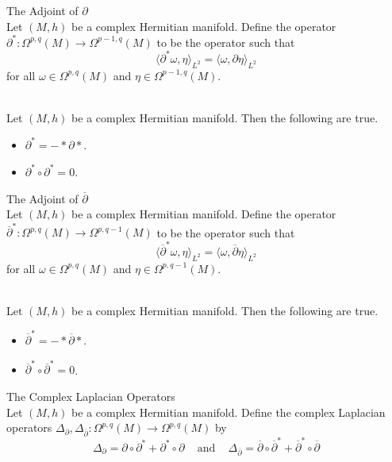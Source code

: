 \documentclass[a4paper]{article}
\begin{document}
\begin{defn}{The Adjoint of $\partial$}{}\\
Let $(M,h)$ be a complex Hermitian manifold. Define the operator $\partial^\ast:\Omega^{p,q}(M)\to\Omega^{p-1,q}(M)$ to be the operator such that $$\langle\partial^\ast\omega,\eta\rangle_{L^2}=\langle\omega,\partial\eta\rangle_{L^2}$$ for all $\omega\in\Omega^{p,q}(M)$ and $\eta\in\Omega^{p-1,q}(M)$. 
\end{defn}

\begin{prp}{}{}\\
Let $(M,h)$ be a complex Hermitian manifold. Then the following are true. 
\begin{itemize}
\item $\partial^\ast=-\ast\partial\ast$. 
\item $\partial^\ast\circ\partial^\ast=0$. 
\end{itemize}
\end{prp}

\begin{defn}{The Adjoint of $\overline{\partial}$}{}\\
Let $(M,h)$ be a complex Hermitian manifold. Define the operator $\overline{\partial}^\ast:\Omega^{p,q}(M)\to\Omega^{p,q-1}(M)$ to be the operator such that $$\langle\overline{\partial}^\ast\omega,\eta\rangle_{L^2}=\langle\omega,\overline{\partial}\eta\rangle_{L^2}$$ for all $\omega\in\Omega^{p,q}(M)$ and $\eta\in\Omega^{p,q-1}(M)$. 
\end{defn}

\begin{prp}{}{}\\
Let $(M,h)$ be a complex Hermitian manifold. Then the following are true. 
\begin{itemize}
\item $\overline{\partial}^\ast=-\ast\overline{\partial}\ast$. 
\item $\overline{\partial}^\ast\circ\overline{\partial}^\ast=0$. 
\end{itemize}
\end{prp}

\begin{defn}{The Complex Laplacian Operators}{}\\
Let $(M,h)$ be a complex Hermitian manifold. Define the complex Laplacian operators $\Delta_{\partial},\Delta_{\overline{\partial}}:\Omega^{p,q}(M)\to\Omega^{p,q}(M)$ by $$\Delta_\partial=\partial\circ\partial^\ast+\partial^\ast\circ\partial\;\;\;\text{ and }\;\;\;\Delta_{\overline{\partial}}=\overline{\partial}\circ\overline{\partial}^\ast+\overline{\partial}^\ast\circ\overline{\partial}$$
\end{defn}
\end{document}
